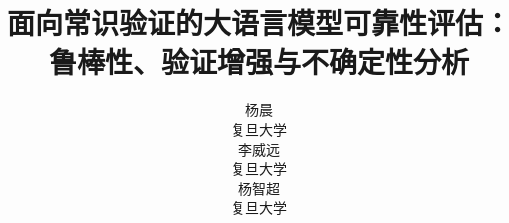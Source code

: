 \documentclass[11pt]{article}
\title{面向常识验证的大语言模型可靠性评估：鲁棒性、验证增强与不确定性分析}
\author{杨晨 \\
  复旦大学 \\ \And
  李威远 \\
  复旦大学 \\\And
  杨智超 \\
  复旦大学 \\}
\begin{document}
\maketitle

\begin{abstract}

\end{abstract}










\appendix

\end{document}
